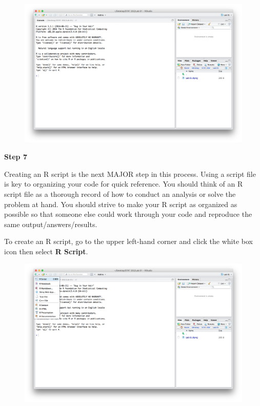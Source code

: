 \documentclass[]{book}
\theoremstyle{definition}
\theoremstyle{definition}
\theoremstyle{definition}
\theoremstyle{remark}
\begin{document}
\begin{figure}
\centering
\includegraphics{./assets/images/01-05.png}
\caption{}
\end{figure}

\textbf{Step 7}

Creating an R script is the next MAJOR step in this process. Using a
script file is key to organizing your code for quick reference. You
should think of an R script file as a thorough record of how to conduct
an analysis or solve the problem at hand. You should strive to make your
R script as organized as possible so that someone else could work
through your code and reproduce the same output/answers/results.

To create an R script, go to the upper left-hand corner and click the
white box icon then select \textbf{R Script}.

\begin{figure}
\centering
\includegraphics{./assets/images/01-06.png}
\caption{}
\end{figure}
\end{document}
